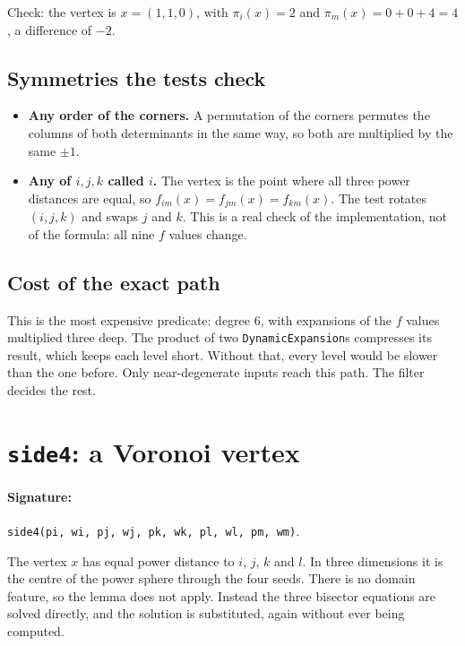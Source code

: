 \documentclass[11pt,a4paper]{article}
\newcommand{\code}[1]{\texttt{#1}}
\theoremstyle{remark}
\begin{document}
Check: the vertex is $x = (1,1,0)$, with $\pi_i(x) = 2$ and $\pi_m(x) = 0 + 0 + 4 = 4$, a
difference of $-2$. \checkmark

\subsection{Symmetries the tests check}

\begin{itemize}
  \item \textbf{Any order of the corners.} A permutation of the corners permutes the columns of both
    determinants in the same way, so both are multiplied by the same $\pm1$.
  \item \textbf{Any of $i, j, k$ called $i$.} The vertex is the point where all three power
    distances are equal, so $f_{im}(x) = f_{jm}(x) = f_{km}(x)$. The test rotates $(i,j,k)$ and
    swaps $j$ and $k$. This is a real check of the implementation, not of the formula: all nine
    $f$ values change.
\end{itemize}

\subsection{Cost of the exact path}

This is the most expensive predicate: degree 6, with expansions of the $f$ values multiplied
three deep. The product of two \code{DynamicExpansion}s compresses its result, which keeps each
level short. Without that, every level would be slower than the one before. Only near-degenerate
inputs reach this path. The filter decides the rest.

\section{\texorpdfstring{\code{side4}}{side4}: a Voronoi vertex}\label{sec:side4}

\paragraph{Signature:} \code{side4(pi, wi, pj, wj, pk, wk, pl, wl, pm, wm)}.

The vertex $x$ has equal power distance to $i$, $j$, $k$ and $l$. In three dimensions it is the
centre of the power sphere through the four seeds. There is no domain feature, so the lemma does
not apply. Instead the three bisector equations are solved directly, and the solution is
substituted, again without ever being computed.
\end{document}
